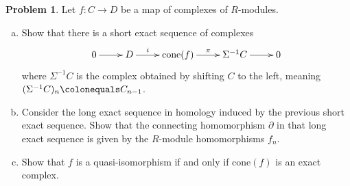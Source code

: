\documentclass[11pt]{article}
\theoremstyle{definition}
\newtheorem{problem}{Problem}
\begin{document}
\vspace{2em}

\noindent
{} 

\begin{problem} 
Let $f\!: C \longrightarrow D$ be a map of complexes of $R$-modules.
	\begin{enumerate}[a)]
		\item Show that there is a short exact sequence of complexes
		$$\xymatrix{0 \ar[r] & D \ar[r]^-i & \textrm{cone}(f) \ar[r]^-{\pi} & \Sigma^{-1} C \ar[r] & 0}$$
		where $\Sigma^{-1} C$ is the complex obtained by shifting $C$ to the left, meaning $(\Sigma^{-1} C)_n \colonequals C_{n-1}$.
		\item Consider the long exact sequence in homology induced by the previous short exact sequence. Show that the connecting homomorphism $\partial$ in that long exact sequence is given by the $R$-module homomorphisms $f_n$.
		\item Show that $f$ is a quasi-isomorphism if and only if $\textrm{cone}(f)$ is an exact complex.
	\end{enumerate}
\end{problem}
\end{document}
